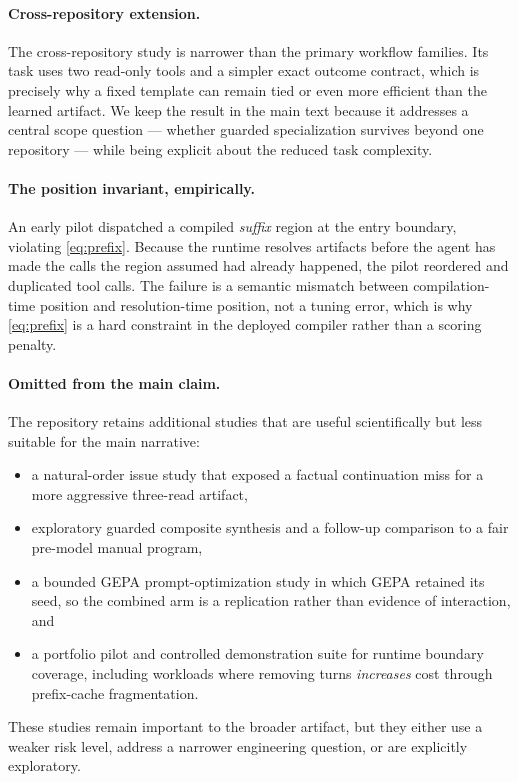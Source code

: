 \paragraph{Cross-repository extension.}
The cross-repository study is narrower than the primary workflow families. Its
task uses two read-only tools and a simpler exact outcome contract, which is
precisely why a fixed template can remain tied or even more efficient than the
learned artifact. We keep the result in the main text because it addresses a
central scope question --- whether guarded specialization survives
beyond one repository --- while being explicit about the reduced task complexity.

\paragraph{The position invariant, empirically.}
\label{app:pilot}
An early pilot dispatched a compiled \emph{suffix} region at the entry boundary,
violating \cref{eq:prefix}. Because the runtime resolves artifacts before the
agent has made the calls the region assumed had already happened, the pilot
reordered and duplicated tool calls. The failure is a semantic mismatch between
compilation-time position and resolution-time position, not a tuning error,
which is why \cref{eq:prefix} is a hard constraint in the deployed compiler
rather than a scoring penalty.

\noindent\begin{minipage}{\linewidth}
\paragraph{Omitted from the main claim.}
The repository retains additional studies that are useful scientifically but
less suitable for the main narrative:
\begin{itemize}[leftmargin=1.2em,itemsep=1pt,topsep=2pt]
  \item a natural-order issue study that exposed a factual continuation miss for
  a more aggressive three-read artifact,
  \item exploratory guarded composite synthesis and a follow-up comparison to a
  fair pre-model manual program,
  \item a bounded GEPA prompt-optimization study in which GEPA retained its
  seed, so the combined arm is a replication rather than evidence of
  interaction, and
  \item a portfolio pilot and controlled demonstration suite for runtime
  boundary coverage, including workloads where removing turns \emph{increases}
  cost through prefix-cache fragmentation.
\end{itemize}
\end{minipage}
These studies remain important to the broader artifact, but they either use a
weaker risk level, address a narrower engineering question, or are explicitly
exploratory.

